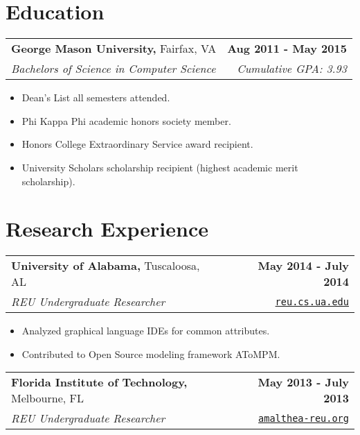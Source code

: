 \documentclass[letterpaper]{article}
\newenvironment{details}
{\begin{itemize}}
{\end{itemize}}
\begin{document}
  \setcounter{secnumdepth}{0}

  \section{Education}

  \noindent
  \begin{tabularx}{\textwidth}{@{}X r@{}}
    \textbf{George Mason University,} Fairfax, VA & \textbf{Aug 2011 - May 2015} \\
    \emph{Bachelors of Science in Computer Science} & \emph{Cumulative GPA: 3.93}
  \end{tabularx}

  \begin{details}
  \item Dean's List all semesters attended.
  \item Phi Kappa Phi academic honors society member.
  \item Honors College Extraordinary Service award recipient.
  \item University Scholars scholarship recipient (highest academic merit scholarship).
  \end{details}


  \section{Research Experience}

  \noindent
  \begin{tabularx}{\textwidth}{@{}X r@{}}
    \textbf{University of Alabama,} Tuscaloosa, AL & \textbf{May 2014 - July 2014} \\
    \emph{REU Undergraduate Researcher} & \texttt{\href{reu.cs.ua.edu}{reu.cs.ua.edu}}
  \end{tabularx}


  \begin{details}
  \item Analyzed graphical language IDEs for common attributes.
  \item Contributed to Open Source modeling framework AToMPM.
  \end{details}

  \noindent
  \begin{tabularx}{\textwidth}{@{}X r@{}}
    \textbf{Florida Institute of Technology,} Melbourne, FL & \textbf{May 2013 - July 2013} \\
    \emph{REU Undergraduate Researcher} & \texttt{\href{amalthea-reu.org}{amalthea-reu.org}}
  \end{tabularx}
\end{document}
